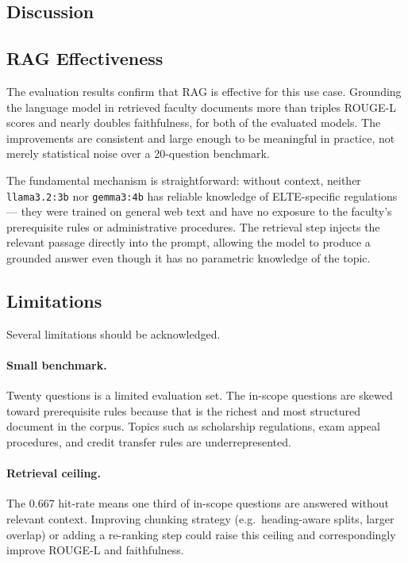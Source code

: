 \subsection{Discussion}
\label{sec:eval-discussion}

\subsection{RAG Effectiveness}

The evaluation results confirm that RAG is effective for this use case. Grounding the language model in retrieved faculty documents more than triples ROUGE-L scores and nearly doubles faithfulness, for both of the evaluated models. The improvements are consistent and large enough to be meaningful in practice, not merely statistical noise over a 20-question benchmark.

The fundamental mechanism is straightforward: without context, neither \texttt{llama3.2:3b} nor \texttt{gemma3:4b} has reliable knowledge of ELTE-specific regulations — they were trained on general web text and have no exposure to the faculty's prerequisite rules or administrative procedures. The retrieval step injects the relevant passage directly into the prompt, allowing the model to produce a grounded answer even though it has no parametric knowledge of the topic.

\subsection{Limitations}

Several limitations should be acknowledged.

\paragraph{Small benchmark.} Twenty questions is a limited evaluation set. The in-scope questions are skewed toward prerequisite rules because that is the richest and most structured document in the corpus. Topics such as scholarship regulations, exam appeal procedures, and credit transfer rules are underrepresented.

\paragraph{Retrieval ceiling.} The 0.667 hit-rate means one third of in-scope questions are answered without relevant context. Improving chunking strategy (e.g.\ heading-aware splits, larger overlap) or adding a re-ranking step could raise this ceiling and correspondingly improve ROUGE-L and faithfulness.

